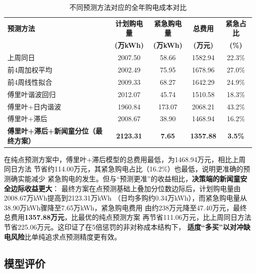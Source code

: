 \documentclass[12pt,a4paper]{article}
\begin{document}
\begin{table}[htbp]
\centering
\small
\setlength{\tabcolsep}{4pt}
\caption{不同预测方法对应的全年购电成本对比}
\begin{tabular}{lcccc}
\toprule
\textbf{预测方法} & \textbf{计划购电量} & \textbf{紧急购电量} & \textbf{总费用} & \textbf{紧急占比} \\
                  & \textbf{(万kWh)}    & \textbf{(万kWh)}    & \textbf{(万元)} & \textbf{(\%)}    \\
\midrule
上周同日               & 2007.50 & 58.66  & 1582.94 & 22.3\% \\
前4周加权平均          & 2002.49 & 75.95  & 1678.96 & 27.0\% \\
前4周线性拟合          & 2009.33 & 68.27  & 1642.29 & 24.9\% \\
傅里叶谐波回归         & 2012.07 & 45.74  & 1510.58 & 18.3\% \\
傅里叶+日内谐波        & 1960.84 & 173.07 & 2068.21 & 43.2\% \\
傅里叶+滞后            & 2008.67 & 38.90  & 1468.94 & 16.2\% \\
\textbf{傅里叶+滞后+新闻童分位（最终方案）}
                       & \textbf{2123.31} & \textbf{7.65} & \textbf{1357.88} & \textbf{3.5\%} \\
\bottomrule
\end{tabular}
\end{table}

在纯点预测方案中，傅里叶+滞后模型的总费用最低，为1468.94万元，相比上周同日方法
节省约114.00万元，其紧急购电占比（16.2\%）也最低，说明更准确的预测确实能减少
紧急购电的发生。但与“预测更准”的收益相比，\textbf{决策端的新闻童安全边际收益更大}：
最终方案在点预测基础上叠加分位数边际后，计划购电量由2008.67万kWh提高到2123.31万kWh
（日均多购约0.34万kWh），而紧急购电量从38.90万kWh骤降至7.65万kWh，紧急购电费用
由约238万元降至47.40万元，最终总费用\textbf{1357.88万元}，比最优的纯点预测方案
再节省111.06万元，比上周同日方法节省225.06万元。这印证了在5倍惩罚的非对称成本结构下，
\textbf{适度“多买”以对冲缺电风险}比单纯追求点预测精度更有效。

\subsection{模型评价}
\end{document}
